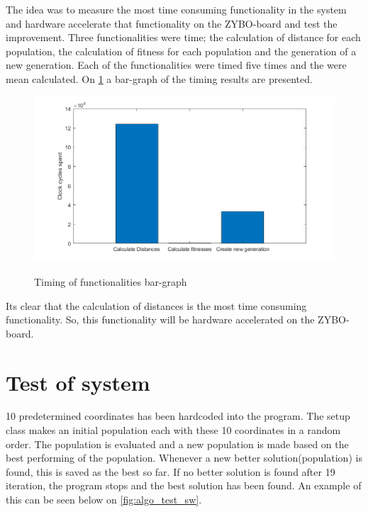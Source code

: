 The idea was to measure the most time consuming functionality in the system and hardware accelerate that functionality on the ZYBO-board and test the improvement. Three functionalities were time; the calculation of distance for each population, the calculation of fitness for each population and the generation of a new generation. Each of the functionalities were timed five times and the were mean calculated. On \cref{fig:timing_barGraph} a bar-graph of the timing results are presented. 

\begin{figure}[H]
	\centering
	{\includegraphics[width=\textwidth]{Images/timing_barGraph.png}}\\[0.5cm]
	\caption{Timing of functionalities bar-graph}
	\label{fig:timing_barGraph}
\end{figure}

Its clear that the calculation of distances is the most time consuming functionality. So, this functionality will be hardware accelerated on the ZYBO-board.


\section{Test of system}
10 predetermined coordinates has been hardcoded into the program. The setup class makes an initial population each with these 10 coordinates in a random order. The population is evaluated and a new population is made based on the best performing of the population. Whenever a new better solution(population) is found, this is saved as the best so far. If no better solution is found after 19 iteration, the program stops and the best solution has been found. An example of this can be seen below on \cref{fig:algo_test_sw}.

